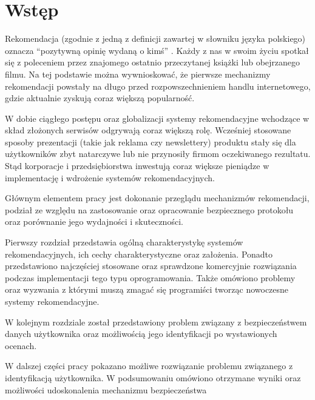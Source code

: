 
\chapter{Wstęp}

\indent Rekomendacja (zgodnie z jedną z definicji zawartej w słowniku języka polskiego) oznacza “pozytywną opinię wydaną o kimś” \cite{pwn}. Każdy z nas w swoim życiu spotkał się z poleceniem przez znajomego ostatnio przeczytanej książki lub obejrzanego filmu. Na tej podstawie można wywnioskować, że pierwsze mechanizmy rekomendacji powstały na długo przed rozpowszechnieniem handlu internetowego, gdzie aktualnie zyskują coraz większą popularność.

\indent W dobie ciągłego postępu oraz globalizacji systemy rekomendacyjne wchodzące w skład złożonych serwisów odgrywają coraz większą rolę. Wcześniej stosowane sposoby prezentacji (takie jak reklama czy newslettery) produktu stały się dla użytkowników zbyt natarczywe lub nie przynosiły firmom oczekiwanego rezultatu. Stąd korporacje i przedsiębiorstwa inwestują coraz większe pieniądze w implementację i wdrożenie systemów rekomendacyjnych.

\indent Głównym elementem pracy jest dokonanie przeglądu mechanizmów rekomendacji, podział ze względu na zastosowanie oraz opracowanie bezpiecznego protokołu oraz porównanie jego wydajności i skuteczności.

\indent Pierwszy rozdział przedstawia ogólną charakterystykę systemów rekomendacyjnych, ich cechy charakterystyczne oraz założenia. Ponadto przedstawiono najczęściej stosowane oraz sprawdzone komercyjnie rozwiązania podczas implementacji tego typu oprogramowania. Także omówiono problemy oraz wyzwania z którymi muszą zmagać się programiści tworząc nowoczesne systemy rekomendacyjne.  

\indent W kolejnym rozdziale został przedstawiony problem związany z bezpieczeństwem danych użytkownika oraz możliwością jego identyfikacji po wystawionych ocenach.

\indent W dalszej części pracy pokazano możliwe rozwiązanie problemu związanego z identyfikacją użytkownika.
W podsumowaniu omówiono otrzymane wyniki oraz możliwości udoskonalenia mechanizmu bezpieczeństwa 
